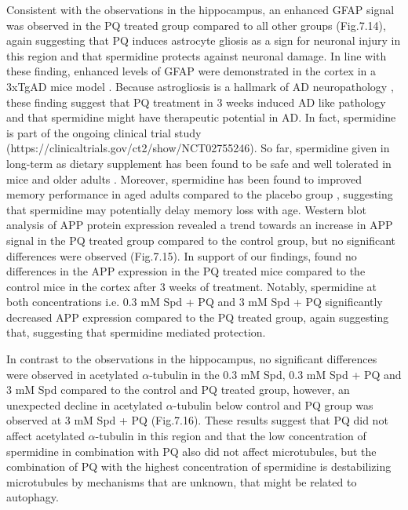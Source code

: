 Consistent with the observations in the hippocampus, an enhanced GFAP signal was observed in the PQ treated group compared to all other groups (Fig.7.14), again suggesting that PQ induces astrocyte gliosis as a sign for neuronal injury in this region and that spermidine protects against neuronal damage. In line with these finding, enhanced levels of GFAP were demonstrated in the cortex in a 3xTgAD mice model \citep{Kamphuis2014,Oddo2003}. Because astrogliosis is a hallmark of AD neuropathology \citep{Gotz2001,Grundke-Iqbal1989}, these finding suggest that PQ treatment in 3 weeks induced AD like pathology and that spermidine might have therapeutic potential in AD. In fact, spermidine is part of the ongoing clinical trial study (https://clinicaltrials.gov/ct2/show/NCT02755246). So far, spermidine given in long-term as dietary supplement has been found to be safe and well tolerated in mice and older adults \citep{Schwarz2018}. Moreover, spermidine has been found to improved memory performance in aged adults compared to the placebo group \citep{Wirth2018}, suggesting that spermidine may potentially delay memory loss with age.
Western blot analysis of APP protein expression revealed a trend towards an increase in APP signal in the PQ treated group compared to the control group, but no significant differences were observed (Fig.7.15). In support of our findings, \citet{Chen2012} found no differences in the APP expression in the PQ treated mice compared to the control mice in the cortex after 3 weeks of treatment. Notably, spermidine at both concentrations i.e. 0.3 mM Spd + PQ and 3 mM Spd + PQ significantly decreased APP expression compared to the PQ treated group, again suggesting that, suggesting that spermidine mediated protection. 

In contrast to the observations in the hippocampus, no significant differences were observed in acetylated $\alpha$-tubulin in the 0.3 mM Spd, 0.3 mM Spd + PQ and 3 mM Spd compared to the control and PQ treated group, however, an unexpected decline in acetylated $\alpha$-tubulin below control and PQ group was observed at 3 mM Spd + PQ (Fig.7.16). These results suggest that PQ did not affect acetylated $\alpha$-tubulin in this region and that the low concentration of spermidine in combination with PQ also did not affect microtubules, but the combination of PQ with the highest concentration of spermidine is destabilizing microtubules by mechanisms that are unknown, that might be related to autophagy. 

